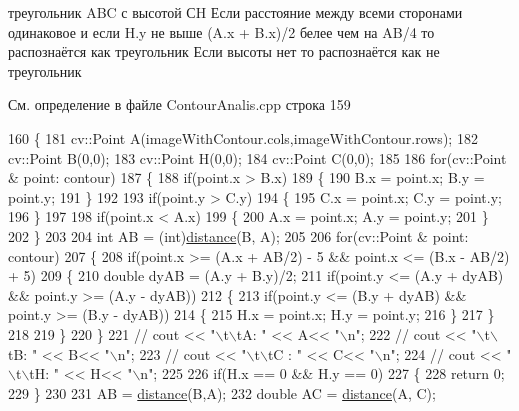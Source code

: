 треугольник A\+B\+C с высотой С\+H Если расстояние между всеми сторонами одинаковое и если H.\+y не выше (A.\+x + B.\+x)/2 белее чем на A\+B/4 то распознаётся как треугольник Если высоты нет то распознаётся как не треугольник

См. определение в файле Contour\+Analis.\+cpp строка 159


\begin{DoxyCode}
160 \{
181     cv::Point A(imageWithContour.cols,imageWithContour.rows);
182     cv::Point B(0,0);
183     cv::Point H(0,0);
184     cv::Point C(0,0);
185 
186     \textcolor{keywordflow}{for}(cv::Point & point: contour)
187     \{
188         \textcolor{keywordflow}{if}(point.x > B.x)
189         \{
190             B.x = point.x; B.y = point.y;
191         \}
192 
193         \textcolor{keywordflow}{if}(point.y > C.y)
194         \{
195             C.x = point.x; C.y = point.y;
196         \}
197 
198         \textcolor{keywordflow}{if}(point.x < A.x)
199         \{
200             A.x = point.x; A.y = point.y;
201         \}
202     \}
203 
204     \textcolor{keywordtype}{int} AB = (int)\hyperlink{class_contour_analis_a4f99f88069c6a746805275d21acdf5b2}{distance}(B, A);
205 
206     \textcolor{keywordflow}{for}(cv::Point & point: contour)
207     \{
208         \textcolor{keywordflow}{if}(point.x >= (A.x + AB/2) - 5 && point.x <= (B.x - AB/2) + 5)
209         \{
210             \textcolor{keywordtype}{double} dyAB = (A.y + B.y)/2;
211             \textcolor{keywordflow}{if}(point.y <= (A.y + dyAB) && point.y >= (A.y - dyAB))
212             \{
213                 \textcolor{keywordflow}{if}(point.y <= (B.y + dyAB) && point.y >= (B.y - dyAB))
214                 \{
215                    H.x = point.x; H.y = point.y;
216                 \}
217             \}
218 
219         \}
220     \}
221 \textcolor{comment}{//    cout << "\(\backslash\)t\(\backslash\)tA: " << A<< "\(\backslash\)n";}
222 \textcolor{comment}{//    cout << "\(\backslash\)t\(\backslash\)tB: " << B<< "\(\backslash\)n";}
223 \textcolor{comment}{//    cout << "\(\backslash\)t\(\backslash\)tC : " << C<< "\(\backslash\)n";}
224 \textcolor{comment}{//    cout << "\(\backslash\)t\(\backslash\)tH: " << H<< "\(\backslash\)n";}
225 
226     \textcolor{keywordflow}{if}(H.x == 0 && H.y == 0)
227     \{
228         \textcolor{keywordflow}{return} 0;
229     \}
230 
231     AB = \hyperlink{class_contour_analis_a4f99f88069c6a746805275d21acdf5b2}{distance}(B,A);
232     \textcolor{keywordtype}{double} AC = \hyperlink{class_contour_analis_a4f99f88069c6a746805275d21acdf5b2}{distance}(A, C);

\end{DoxyCode}
